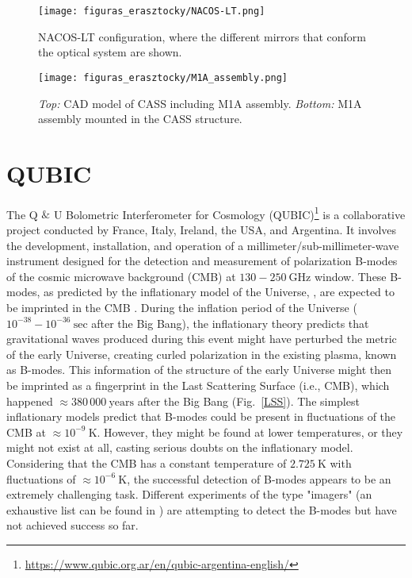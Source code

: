 \documentclass[baaa]{baaa}
\begin{document}
\begin{figure}[!h]
\centering
\texttt{[image: figuras\_erasztocky/NACOS-LT.png]}
\caption{NACOS-LT configuration, where the different mirrors that conform the optical system are shown.}
\label{NACOS-LT}
\end{figure}

\begin{figure}[!t]
\centering
\texttt{[image: figuras\_erasztocky/M1A\_assembly.png]}
\caption{\emph{Top:} CAD model of CASS including M1A assembly. \emph{Bottom:} M1A assembly mounted in the CASS structure.}
\label{M1A_assembly}
\end{figure}


\section{QUBIC}\label{sec:QUBIC}

The Q $\&$ U Bolometric Interferometer for Cosmology (QUBIC)\footnote{\url{https://www.qubic.org.ar/en/qubic-argentina-english/}} is a collaborative project conducted by France, Italy, Ireland, the USA, and Argentina. It involves the development, installation, and operation of a millimeter/sub-millimeter-wave instrument designed for the detection and measurement of polarization B-modes of the cosmic microwave background (CMB) \citep{battistelli2020qubic} at $130-250~\mathrm{GHz}$ window. These B-modes, as predicted by the inflationary model of the Universe\citep{guth1981inflationary}, \citep{linde1982new}, are expected to be imprinted in the CMB \citep{durrer2015cosmic}. During the inflation period of the Universe ($10^{-38}- 10^{-36}~\mathrm{sec}$ after the Big Bang), the inflationary theory predicts that gravitational waves produced during this event might have perturbed the metric of the early Universe, creating curled polarization in the existing plasma, known as B-modes. This information of the structure of the early Universe might then be imprinted as a fingerprint in the Last Scattering Surface (i.e., CMB), which happened $\approx 380\,000~\mathrm{years}$ after the Big Bang (Fig.~\ref{LSS}). The simplest inflationary models predict that B-modes could be present in fluctuations of the CMB at $\approx 10^{-9}~\mathrm{K}$. However, they might be found at lower temperatures, or they might not exist at all, casting serious doubts on the inflationary model. Considering that the CMB has a constant temperature of  $2.725~\mathrm{K}$ with fluctuations of $\approx 10^{-6}~\mathrm{K}$, the successful detection of B-modes appears to be an extremely challenging task. 
Different experiments of the type "imagers" (an exhaustive list can be found in \citep{abitbol2017cmb}) are attempting to detect the B-modes but have not achieved success so far.
\end{document}
